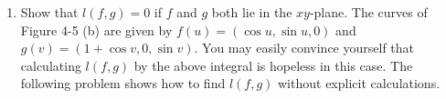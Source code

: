 \begin{problems}
{\begin{enumerate}[label=(\alph*)]
                where 
                \begin{align*}
                    A(u,v)=\det
                    \begin{pmatrix}
                        (f^1)^{\prime}(u)&(f^2)^{\prime}(u)&(f^3)^{\prime}(u)\\
                        (g^1)^{\prime}(v)&(g^2)^{\prime}(v)&(g^3)^{\prime}(v)\\
                        f^1(u)-g^1(v)&f^2(u)-g^2(v)&f^3(u)-g^3(v)
                    \end{pmatrix}.
                \end{align*}
            \item Show that $l(f,g) = 0$ if $f$ and $g$ both lie in the $xy$-plane.
                The curves of Figure 4-5 (b) are given by $f(u) = (\cos u, \sin u, 0)$
                and $g(v) = (1 +\cos v, 0, \sin v)$. You may easily convince yourself that 
                calculating $l(f,g)$ by the above integral is hopeless in this case. 
                The following problem shows how to find $l(f,g)$ without explicit calculations.
        \end{enumerate}
    }
\end{problems}
